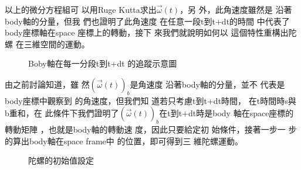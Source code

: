 \documentclass[12pt,a4paper]{article}
\begin{document}
以上的微分方程組可%
以用Ruge Kutta求出$\vec{\omega}(t)$，另%
外，此角速度雖然是%
沿著body軸的分量，但我%
們也證明了此角速度%
在任意一段t到t+dt的時間%
中代表了body座標軸在space%
座標上的轉動，接下%
來我們就說明如何以%
這個特性重構出陀螺%
在三維空間的運動。%
\bigskip

\begin{figure}[th]
\caption{Boby軸在每一分段t到t+dt%
的追蹤示意圖}
\begin{center}
\end{center}
\end{figure}

由之前討論知道，雖%
然$\left( \vec{\omega}(t)\right) _{b}$是角速度%
沿著body軸的分量，並不%
代表是body座標中觀察到%
的角速度，但我們知%
道若只考慮t到t+dt時間，%
在t時間時s與b重和，在%
此條件下我們證明了$%
\left( \vec{\omega}(t)\right) _{b}$在t到t+dt時是body%
軸在space座標的轉動矩陣%
，也就是body軸的轉動速%
度，因此只要給定初%
始條件，接著一步一%
步的算出body軸在space frame中%
的位置，即可得到三%
維陀螺運動。\bigskip

\begin{figure}[th]
\caption{陀螺的初始值設定}
\begin{center}
\end{center}
\end{figure}
\end{document}
